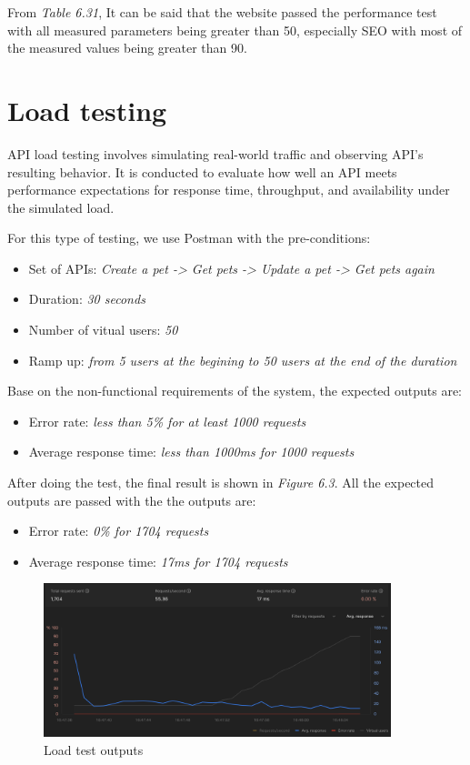 

From \textit{Table 6.31}, It can be said that the website passed the performance test with all measured parameters being greater than 50, especially SEO with most of the measured values being greater than 90.

\section{Load testing}
API load testing involves simulating real-world traffic and observing API’s resulting behavior. It is conducted to evaluate how well an API meets performance expectations for response time, throughput, and availability under the simulated load.

For this type of testing, we use Postman with the pre-conditions:
\begin{itemize}
  \item Set of APIs: \textit{ Create a pet -> Get pets -> Update a pet -> Get pets again}
  \item Duration: \textit{30 seconds}
  \item Number of vitual users: \textit{50}
  \item Ramp up: \textit{from 5 users at the begining to 50 users at the end of the duration}
\end{itemize}

Base on the non-functional requirements of the system, the expected outputs are:
\begin{itemize}
  \item Error rate: \textit{less than 5\% for at least 1000 requests}
  \item Average response time: \textit{less than 1000ms for 1000 requests}
\end{itemize}

After doing the test, the final result is shown in \textit{Figure 6.3}. All the expected outputs are passed with the the outputs are:
\begin{itemize}
  \item Error rate: \textit{0\% for 1704 requests}
  \item Average response time: \textit{17ms for 1704 requests}
\end{itemize}

\begin{figure}[H]
  \centering
  \includegraphics[width=0.9\textwidth]{Figures/load_test.png}
  \caption{Load test outputs}
\end{figure}